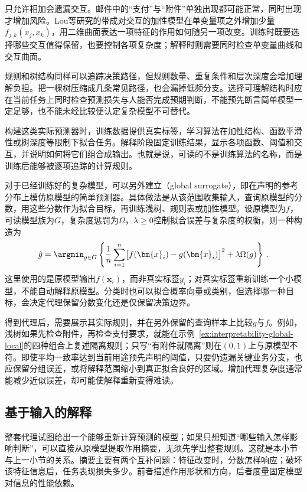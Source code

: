 只允许相加会遗漏交互。邮件中的“支付”与“附件”单独出现都可能正常，同时出现才增加风险。Lou等研究的带成对交互的加性模型在单变量项之外增加少量$f_{j,k}(x_j,x_k)$，用二维曲面表达一项特征的作用如何随另一项改变。训练时既要选择哪些交互值得保留，也要控制各项复杂度；解释时则需要同时检查单变量曲线和交互曲面。

规则和树结构同样可以追踪决策路径，但规则数量、重复条件和层次深度会增加理解负担。把一棵树压缩成几条常见路径，也会漏掉低频分支。选择可理解结构时应在当前任务上同时检查预测损失与人能否完成预期判断，不能预先断言简单模型一定足够，也不能未经比较便认定复杂模型不可替代。

构建这类实际预测器时，训练数据提供真实标签，学习算法在加性结构、函数平滑性或树深度等限制下拟合任务。解释阶段固定训练结果，显示各项函数、阈值和交互，并说明如何将它们组合成输出。也就是说，可读的不是训练算法的名称，而是训练后能够被逐项追踪的计算规则。

对于已经训练好的复杂模型，可以另外建立（global surrogate），即在声明的参考分布上模仿原模型的简单预测器。具体做法是从该范围收集输入，查询原模型的分数，用这些分数作为拟合目标，再训练浅树、规则表或加性模型。设原模型为$f$，可读模型族为$G$，复杂度惩罚为$\Omega$，$\lambda\geq0$控制拟合误差与复杂度的权衡，则一种构造为
\begin{equation}
 \hat g=\argmin_{g\in G}\left\{
 \frac1n\sum_{i=1}^n\bigl[f(\bm{x}_i)-g(\bm{x}_i)\bigr]^2
 +\lambda\Omega(g)\right\}\, .
 \label{eq:interpretability-global-surrogate}
\end{equation}
这里使用的是原模型输出$f(\bm{x}_i)$，而非真实标签$y_i$；对真实标签重新训练一个小模型，不能自动解释原模型。分类时也可以拟合概率向量或类别，但选择哪一种目标，会决定代理保留分数变化还是仅保留决策边界。

得到代理后，需要展示其实际规则，并在另外保留的查询样本上比较$g$与$f$。例如，浅树如果先检查附件，再检查支付要求，就能在示例~\ref{ex:interpretability-global-local}的四种组合上复述隔离规则；只写“有附件就隔离”则在$(0,1)$上与原模型不符。即使平均一致率达到当前用途预先声明的阈值，只要仍遗漏关键业务分支，也应保留分组误差，或将解释范围缩小到真正拟合良好的区域。增加代理复杂度通常能减少近似误差，却可能使解释重新变得难读。

\subsection{基于输入的解释}
\label{sec:interpretability-global-dependence}

整套代理试图给出一个能够重新计算预测的模型；如果只想知道“哪些输入怎样影响判断”，可以直接从原模型提取作用摘要，无须先学出整套规则。这就是本小节与上一小节的关系。摘要主要有两个互补问题：特征改变时，分数怎样响应；破坏该特征信息后，任务表现损失多少。前者描述作用形状和方向，后者度量固定模型对信息的性能依赖。

